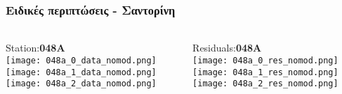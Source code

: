 \begin{frame}
  \frametitle{Ειδικές περιπτώσεις - Σαντορίνη}
  \framesubtitle{}
  \label{}
  \vskip-1cm
  \begin{columns}[T]
    \begin{column}{.33\textwidth}
      \begin{center}
      Station:\textbf{048A}\\
         \texttt{[image: 048a\_0\_data\_nomod.png]}\\
         \texttt{[image: 048a\_1\_data\_nomod.png]}\\
         \texttt{[image: 048a\_2\_data\_nomod.png]}
       \end{center} 
    \end{column}
    \begin{column}{.33\textwidth}
      \begin{center}
      Residuals:\textbf{048A}\\
         \texttt{[image: 048a\_0\_res\_nomod.png]}\\
         \texttt{[image: 048a\_1\_res\_nomod.png]}\\
         \texttt{[image: 048a\_2\_res\_nomod.png]}
       \end{center} 
      
    \end{column}
  \end{columns}
\end{frame}
\note{}


